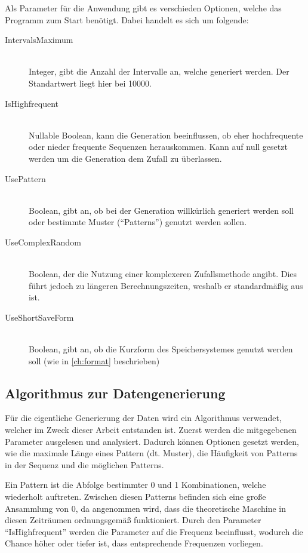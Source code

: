 \newpage
{}
Als Parameter für die Anwendung gibt es verschieden Optionen, welche das Programm zum Start benötigt. Dabei handelt es sich um folgende:

\vspace{10pt}
\begin{description} 
	\item[IntervalsMaximum] \hfill \\ Integer, gibt die Anzahl der Intervalle an, welche generiert werden. Der Standartwert liegt hier bei 10000.
	\item[IsHighfrequent] \hfill \\ Nullable Boolean, kann die Generation beeinflussen, ob eher hochfrequente oder nieder frequente Sequenzen herauskommen. Kann auf null gesetzt werden um die Generation dem Zufall zu überlassen.
	\item[UsePattern] \hfill \\ Boolean, gibt an, ob bei der Generation willkürlich generiert werden soll oder bestimmte Muster (\enquote{Patterns}) genutzt werden sollen.
	\item[UseComplexRandom] \hfill \\ Boolean, der die Nutzung einer komplexeren Zufallsmethode angibt. Dies führt jedoch zu längeren Berechnungszeiten, weshalb er standardmäßig aus ist.
	\item[UseShortSaveForm] \hfill \\ Boolean, gibt an, ob die Kurzform des Speichersystemes genutzt werden soll (wie in \autoref{ch:format} beschrieben)
\end{description} 

\subsection{Algorithmus zur Datengenerierung}

Für die eigentliche Generierung der Daten wird ein Algorithmus verwendet, welcher im Zweck dieser Arbeit entstanden ist. Zuerst werden die mitgegebenen Parameter ausgelesen und analysiert. Dadurch können Optionen gesetzt werden, wie die maximale Länge eines Pattern (dt. Muster), die Häufigkeit von Patterns in der Sequenz und die möglichen Patterns.

Ein Pattern ist die Abfolge bestimmter 0 und 1 Kombinationen, welche wiederholt auftreten. Zwischen diesen Patterns befinden sich eine große Ansammlung von 0, da angenommen wird, dass die theoretische Maschine in diesen Zeiträumen ordnungsgemäß funktioniert. Durch den Parameter \enquote{IsHighfrequent} werden die Parameter auf die Frequenz beeinflusst, wodurch die Chance höher oder tiefer ist, dass entsprechende Frequenzen vorliegen.

